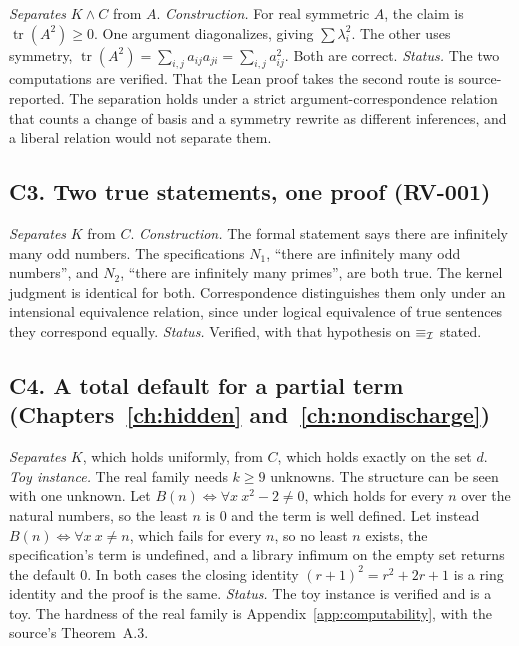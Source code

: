 \emph{Separates} $K\wedge C$ from $A$. \emph{Construction.} For real symmetric $A$, the claim is $\operatorname{tr}(A^2)\ge0$. One argument diagonalizes, giving $\sum\lambda_i^2$. The other uses symmetry, $\operatorname{tr}(A^2)=\sum_{i,j}a_{ij}a_{ji}=\sum_{i,j}a_{ij}^2$. Both are correct. \emph{Status.} The two computations are verified. That the Lean proof takes the second route is source-reported. The separation holds under a strict argument-correspondence relation that counts a change of basis and a symmetry rewrite as different inferences, and a liberal relation would not separate them.

\subsection*{C3. Two true statements, one proof (RV-001)}

\emph{Separates} $K$ from $C$. \emph{Construction.} The formal statement says there are infinitely many odd numbers. The specifications $N_1$, ``there are infinitely many odd numbers'', and $N_2$, ``there are infinitely many primes'', are both true. The kernel judgment is identical for both. Correspondence distinguishes them only under an intensional equivalence relation, since under logical equivalence of true sentences they correspond equally. \emph{Status.} Verified, with that hypothesis on $\equiv_{\mathcal{I}}$ stated.

\subsection*{C4. A total default for a partial term (Chapters~\ref{ch:hidden} and~\ref{ch:nondischarge})}

\emph{Separates} $K$, which holds uniformly, from $C$, which holds exactly on the set $d$. \emph{Toy instance.} The real family needs $k\ge9$ unknowns. The structure can be seen with one unknown. Let $B(n)\iff\forall x\ x^2-2\neq0$, which holds for every $n$ over the natural numbers, so the least $n$ is $0$ and the term is well defined. Let instead $B(n)\iff\forall x\ x\neq n$, which fails for every $n$, so no least $n$ exists, the specification's term is undefined, and a library infimum on the empty set returns the default $0$. In both cases the closing identity $(r+1)^2=r^2+2r+1$ is a ring identity and the proof is the same. \emph{Status.} The toy instance is verified and is a toy. The hardness of the real family is Appendix~\ref{app:computability}, with the source's Theorem~A.3.

